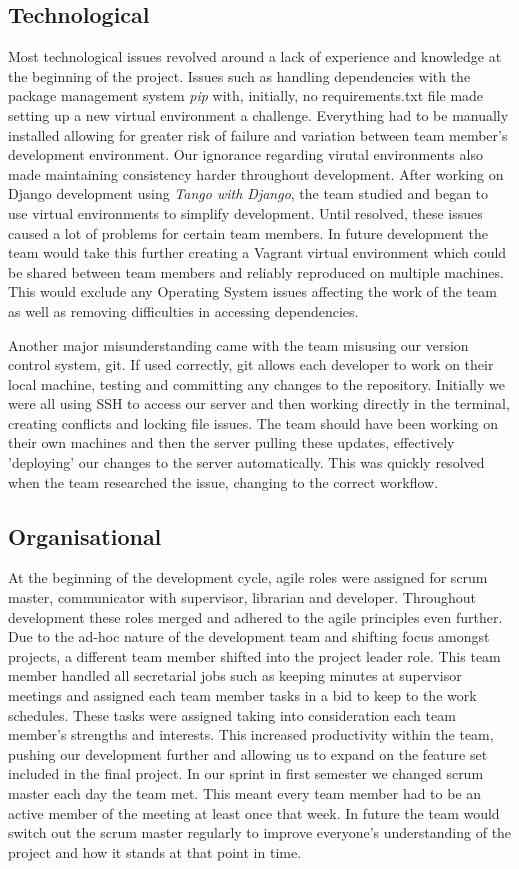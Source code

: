 \documentclass{l3proj}
\begin{document}
\subsection{Technological}
Most technological issues revolved around a lack of experience and knowledge at
the beginning of the project. Issues such as handling dependencies with the package management system \textit{pip} with, initially, no requirements.txt file made setting up a new virtual environment a challenge. Everything had to be manually installed allowing for greater risk of failure and variation between team member's development environment. Our ignorance regarding virutal environments also made maintaining consistency harder throughout development. After working on Django development using \textit{Tango with Django}, the team studied and began to use virtual environments to simplify development. Until resolved, these issues caused a lot of problems for certain team members. In future development the team would take this further creating a Vagrant virtual environment which could be shared between team members and reliably reproduced on multiple machines. This would exclude any Operating System issues affecting the work of the team as well as removing difficulties in accessing dependencies.

Another major misunderstanding came with the team misusing our version control system, git. If used correctly, git allows each developer to work on their local machine, testing and committing any changes to the repository. Initially we were all using SSH to access our server and then working directly in the terminal, creating conflicts and locking file issues. The team should have been working on their own machines and then the server pulling these updates, effectively 'deploying' our changes to the server automatically. This was quickly resolved when the team researched the issue, changing to the correct workflow.

\subsection{Organisational}    At the beginning of the development cycle, agile roles were assigned for scrum master, communicator with supervisor, librarian and developer. Throughout development these roles merged and adhered to the agile principles even further. Due to the ad-hoc nature of the development team and shifting focus amongst projects, a different team member shifted into the project leader role. This team member handled all secretarial jobs such as keeping minutes at supervisor meetings and assigned each team member tasks in a bid to keep to the work schedules. These tasks were assigned taking into consideration each team member's strengths and interests. This increased productivity within the team, pushing our development further and allowing us to expand on the feature set included in the final project. In our sprint in first semester we changed scrum master each day the team met. This meant every team member had to be an active member of the meeting at least once that week. In future the team would switch out the scrum master regularly to improve everyone's understanding of the project and how it stands at that point in time.
\end{document}
